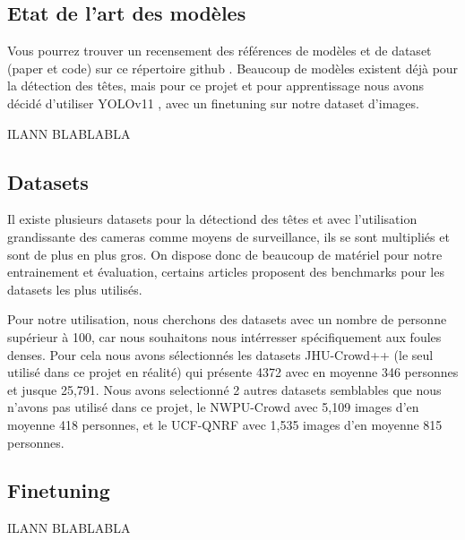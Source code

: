 
\subsection{Etat de l'art des modèles}

Vous pourrez trouver un recensement des références de modèles et de dataset (paper et code) sur ce répertoire github \cite{state_of_the_art_crowd_counting}. Beaucoup de modèles existent déjà pour la détection des têtes, mais pour ce projet et pour apprentissage nous avons décidé d'utiliser YOLOv11 \cite{khanam2024yolov11overviewkeyarchitectural}, avec un finetuning sur notre dataset d'images.

ILANN BLABLABLA

\subsection{Datasets}

Il existe plusieurs datasets pour la détectiond des têtes et avec l'utilisation grandissante des cameras comme moyens de surveillance, ils se sont multipliés et sont de plus en plus gros. On dispose donc de beaucoup de matériel pour notre entrainement et évaluation, certains articles \cite{state_of_the_art_datasets} proposent des benchmarks pour les datasets les plus utilisés.

Pour notre utilisation, nous cherchons des datasets avec un nombre de personne supérieur à 100, car nous souhaitons nous intérresser spécifiquement aux foules denses. Pour cela nous avons sélectionnés les datasets JHU-Crowd++ \cite{sindagi2020jhu-crowd++} (le seul utilisé dans ce projet en réalité) qui présente 4372 avec en moyenne 346 personnes et jusque 25,791.
Nous avons selectionné 2 autres datasets semblables que nous n'avons pas utilisé dans ce projet, le NWPU-Crowd \cite{gao2020nwpu} avec 5,109 images d'en moyenne 418 personnes, et le UCF-QNRF \cite{idress2018ucfqnrf} avec 1,535 images d'en moyenne 815 personnes.

\subsection{Finetuning}

ILANN BLABLABLA